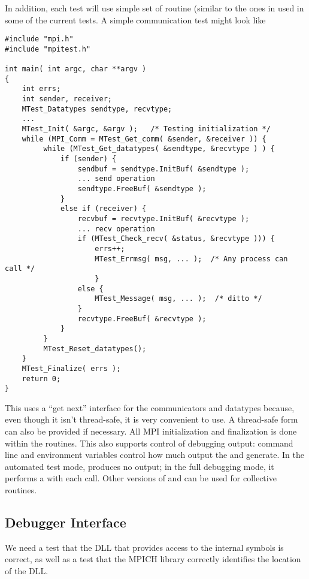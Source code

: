 \documentclass{article}
\begin{document}
In addition, each test will use simple set of routine (similar to the
ones in  used in some of the current tests.  A simple
communication test might look like
\begin{verbatim}
#include "mpi.h"
#include "mpitest.h"

int main( int argc, char **argv )
{
    int errs;
    int sender, receiver;
    MTest_Datatypes sendtype, recvtype;
    ...
    MTest_Init( &argc, &argv );   /* Testing initialization */
    while (MPI_Comm = MTest_Get_comm( &sender, &receiver )) {
         while (MTest_Get_datatypes( &sendtype, &recvtype ) ) {
             if (sender) {
                 sendbuf = sendtype.InitBuf( &sendtype );
                 ... send operation
                 sendtype.FreeBuf( &sendtype );
             } 
             else if (receiver) {
                 recvbuf = recvtype.InitBuf( &recvtype );
                 ... recv operation
                 if (MTest_Check_recv( &status, &recvtype ))) {
                     errs++;
                     MTest_Errmsg( msg, ... );  /* Any process can call */
                     }
                 else {
                     MTest_Message( msg, ... );  /* ditto */
                 }
                 recvtype.FreeBuf( &recvtype );
             }
         }
         MTest_Reset_datatypes();
    }
    MTest_Finalize( errs );
    return 0;
}
\end{verbatim}
This uses a ``get next'' interface for the communicators and datatypes
because, even though it isn't thread-safe, it is very convenient to
use.  A thread-safe form can also be provided if necessary.  All MPI
initialization and finalization is done within the 
routines.  This also supports control of debugging output: command
line and environment variables control how much output the
 and  generate.  In the
automated test mode,  produces no output; in the
full debugging mode, it performs a  with each
call.  Other versions of  and
 can be used for collective routines.

\subsection{Debugger Interface}
\label{sec:debug-interface}
We need a test that the DLL that provides access to the internal
symbols is correct, as well as a test that the MPICH library correctly
identifies the location of the DLL.
\end{document}
